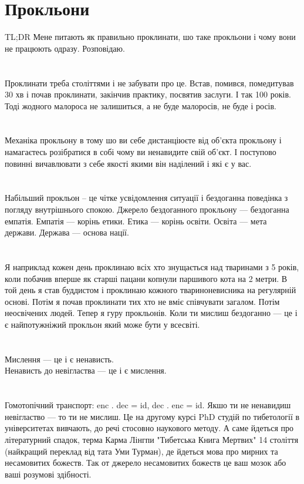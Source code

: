\section{Прокльони}

TL;DR Мене питають як правильно проклинати, шо таке прокльони і чому вони не працюють одразу. Розповідаю.\\
\\
\\
Проклинати треба століттями і не забувати про це. Встав, помився, помедитував 30 хв і почав проклинати, закінчив практику, посвятив заслуги. І так 100 років. Тоді жодного малороса не залишиться, а не буде малоросів, не буде і росів.\\
\\
\\
Механіка прокльону в тому шо ви себе дистанціюєте від об'єкта прокльону і намагаєтесь розібратися в собі чому ви ненавидите свій об'єкт. І поступово повинні вичавлювати з себе якості якими він наділений і які є у вас.\\
\\
\\
Набільший прокльон -- це чітке усвідомлення ситуації і бездоганна поведінка з погляду внутрішнього спокою. Джерело бездоганного прокльону — бездоганна емпатія. Емпатія — корінь етики. Етика — корінь освіти. Освіта — мета держави. Держава — основа нації.\\
\\
\\
Я наприклад кожен день проклинаю всіх хто знущається над тваринами з 5 років, коли побачив вперше як старші пацани копнули паршивого кота на 2 метри. В той день я став буддистом і проклинаю кожного твариноневисника на регулярній основі. Потім я почав проклинати тих хто не вміє співчувати загалом. Потім неосвічених людей. Тепер я гуру прокльонів. Коли ти мислиш бездоганно — це і є найпотужніжий прокльон який може бути у всесвіті.\\
\\
\\
Мислення — це і є ненависть.\\
Ненависть до невігластва — це і є мислення.\\
\\
\\
Гомотопічний транспорт: enc . dec = id, dec . enc = id. Якшо ти не ненавидиш невігластво — то ти не мислиш. Це на другому курсі PhD студій по тибетології в університетах вивчають, до речі стосовно наукового методу. А саме йдеться про літературний спадок, терма Карма Лінгпи "Тибетська Книга Мертвих" 14 століття (найкращий переклад від тата Уми Турман), де йдеться мова про мирних та несамовитих божеств. Так от джерело несамовитих божеств це ваш мозок або ваші розумові здібності.
